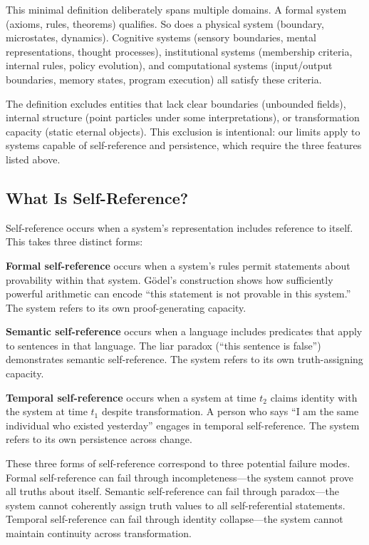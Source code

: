 \documentclass[12pt]{article}
\begin{document}
This minimal definition deliberately spans multiple domains. A formal system (axioms, rules, theorems) qualifies. So does a physical system (boundary, microstates, dynamics). Cognitive systems (sensory boundaries, mental representations, thought processes), institutional systems (membership criteria, internal rules, policy evolution), and computational systems (input/output boundaries, memory states, program execution) all satisfy these criteria.

The definition excludes entities that lack clear boundaries (unbounded fields), internal structure (point particles under some interpretations), or transformation capacity (static eternal objects). This exclusion is intentional: our limits apply to systems capable of self-reference and persistence, which require the three features listed above.

\subsection{What Is Self-Reference?}

Self-reference occurs when a system's representation includes reference to itself. This takes three distinct forms:

\textbf{Formal self-reference} occurs when a system's rules permit statements about provability within that system. Gödel's construction shows how sufficiently powerful arithmetic can encode ``this statement is not provable in this system.'' The system refers to its own proof-generating capacity.

\textbf{Semantic self-reference} occurs when a language includes predicates that apply to sentences in that language. The liar paradox (``this sentence is false'') demonstrates semantic self-reference. The system refers to its own truth-assigning capacity.

\textbf{Temporal self-reference} occurs when a system at time $t_2$ claims identity with the system at time $t_1$ despite transformation. A person who says ``I am the same individual who existed yesterday'' engages in temporal self-reference. The system refers to its own persistence across change.

These three forms of self-reference correspond to three potential failure modes. Formal self-reference can fail through incompleteness—the system cannot prove all truths about itself. Semantic self-reference can fail through paradox—the system cannot coherently assign truth values to all self-referential statements. Temporal self-reference can fail through identity collapse—the system cannot maintain continuity across transformation.
\end{document}

